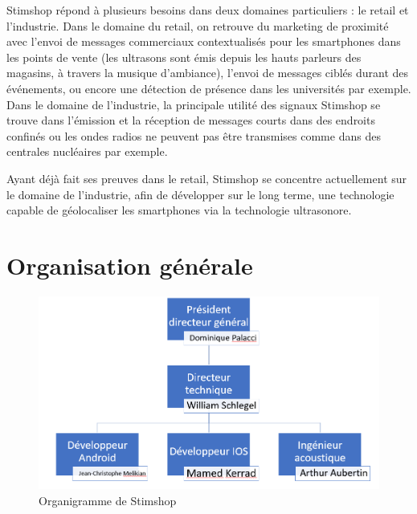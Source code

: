 \documentclass[12pt]{report}
\begin{document}
Stimshop répond à plusieurs besoins dans deux domaines particuliers : le retail et l'industrie.  Dans le domaine du retail, on retrouve du marketing de proximité avec l'envoi de messages commerciaux contextualisés pour les smartphones dans les points de vente (les ultrasons sont émis depuis les hauts parleurs des magasins, à travers la musique d'ambiance), l'envoi de messages ciblés durant des événements, ou encore une détection de présence dans les universités par exemple. Dans le domaine de l'industrie, la principale utilité des signaux Stimshop se trouve dans l'émission et la réception de messages courts dans des endroits confinés ou les ondes radios ne peuvent pas être transmises comme dans des centrales nucléaires par exemple. 

Ayant déjà fait ses preuves dans le retail, Stimshop se concentre actuellement sur le domaine de l'industrie, afin de développer sur le long terme, une technologie capable de géolocaliser les smartphones via la technologie ultrasonore. \\

	\section{Organisation générale}

\begin{figure}
\begin{center}
\includegraphics[scale=0.6]{organigramme.PNG}
\end{center}
\caption{Organigramme de Stimshop}
\label{Organigramme de Stimshop}
\end{figure}
\end{document}
